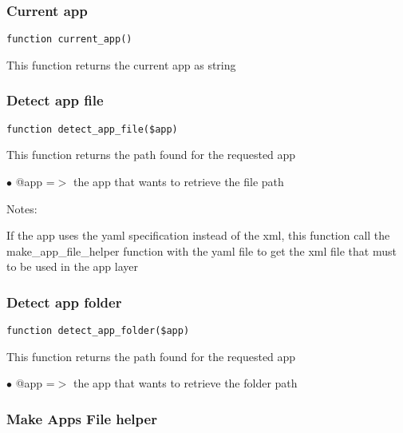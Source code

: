 \documentclass[a4paper]{article}
\begin{document}
\hypertarget{toc46}{}
\subsubsection{Current app}

\begin{lstlisting}
function current_app()
\end{lstlisting}

This function returns the current app as string

\hypertarget{toc47}{}
\subsubsection{Detect app file}

\begin{lstlisting}
function detect_app_file($app)
\end{lstlisting}

This function returns the path found for the requested app

\begin{compactitem}
\item[\color{myblue}$\bullet$] @app =$>$ the app that wants to retrieve the file path
\end{compactitem}

Notes:

If the app uses the yaml specification instead of the xml, this
function call the make\_app\_file\_helper function with the yaml file
to get the xml file that must to be used in the app layer

\hypertarget{toc48}{}
\subsubsection{Detect app folder}

\begin{lstlisting}
function detect_app_folder($app)
\end{lstlisting}

This function returns the path found for the requested app

\begin{compactitem}
\item[\color{myblue}$\bullet$] @app =$>$ the app that wants to retrieve the folder path
\end{compactitem}

\hypertarget{toc49}{}
\subsubsection{Make Apps File helper}
\end{document}
